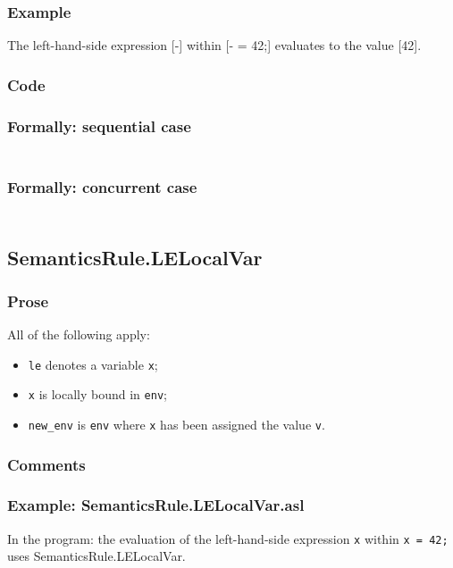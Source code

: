 \documentclass{book}
\begin{document}
  \subsubsection{Example}
  The left-hand-side expression [-] within [- = 42;] evaluates to the value [42].

  \subsubsection{Code}

  \subsubsection{Formally: sequential case}
  \begin{align}
  \end{align} 

  \subsubsection{Formally: concurrent case}
  \begin{align}
  \end{align} 

\subsection{SemanticsRule.LELocalVar \label{sec:SemanticsRule.LELocalVar}}

    \subsubsection{Prose}
    All of the following apply:
    \begin{itemize}
    \item \texttt{le} denotes a variable \texttt{x};
    \item \texttt{x} is locally bound in \texttt{env};
    \item \texttt{new\_env} is \texttt{env} where \texttt{x} has been assigned the value \texttt{v}.
    \end{itemize}

  \subsubsection{Comments}

    \subsubsection{Example: SemanticsRule.LELocalVar.asl}
    In the program:
    the evaluation of the left-hand-side expression \texttt{x} within \texttt{x = 42;} uses SemanticsRule.LELocalVar.
\end{document}
